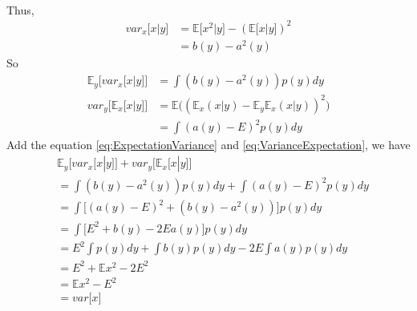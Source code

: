 \documentclass[12pt, a4paper]{article}
\newcommand{\E}{\mathbb{E}}
\begin{document}
\begin{itemize}
\begin{align*}
        \end{align*}
        Thus,
        \begin{align}
            \label{Eq:ConditionalVariance}
            var_x\lbrack x|y\rbrack&=\E\lbrack x^2|y\rbrack-(\E\lbrack x|y\rbrack)^2
            \nonumber\\
            &=b(y)-a^2(y)
        \end{align}
        So
        \begin{align}
            \label{eq:ExpectationVariance}
            \E_y\lbrack var_x\lbrack x|y\rbrack\rbrack&=\int(b(y)-a^2(y))p(y)dy\\
            \label{eq:VarianceExpectation}
            var_y\lbrack\E_x\lbrack x|y\rbrack\rbrack&=
            \E\big((\E_x(x|y)-\E_y\E_x(x|y))^2\big)\nonumber\\
            &=\int(a(y)-E)^2p(y)dy
        \end{align}
        Add the equation \ref{eq:ExpectationVariance} and \ref{eq:VarianceExpectation},
        we have
        \begin{align*}
            &\E_y\lbrack var_x\lbrack x|y\rbrack\rbrack+var_y\lbrack\E_x\lbrack x|y
            \rbrack\rbrack\\
            &=\int(b(y)-a^2(y))p(y)dy+\int(a(y)-E)^2p(y)dy\\
            &=\int\lbrack(a(y)-E)^2+(b(y)-a^2(y))\rbrack p(y)dy\\
            &=\int\lbrack E^2+b(y)-2Ea(y)\rbrack p(y)dy\\
            &=E^2\int p(y)dy+\int b(y)p(y)dy-2E\int a(y)p(y)dy\\
            &=E^2+\E x^2-2E^2\\
            &=\E x^2-E^2\\
            &=var\lbrack x\rbrack
        \end{align*}
    \end{itemize}
\end{document}
